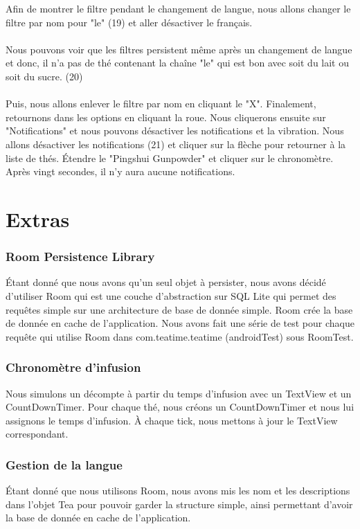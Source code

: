 \documentclass[a4paper,12pt]{article}
\begin{document}
\begin{spacing}{1}
	Afin de montrer le filtre pendant le changement de langue, nous allons changer le filtre par nom pour "le" (19) et aller désactiver le français. \\\\
	Nous pouvons voir que les filtres persistent même après un changement de langue et donc, il n'a pas de thé contenant la chaîne "le" qui est bon avec soit du lait ou soit du sucre. (20)\\\\
	Puis, nous allons enlever le filtre par nom en cliquant le "X".
	Finalement, retournons dans les options en cliquant la roue. Nous cliquerons ensuite sur "Notifications" et nous pouvons désactiver les notifications et la vibration. Nous allons désactiver les notifications (21) et cliquer sur la flèche pour retourner à la liste de thés.
	Étendre le "Pingshui Gunpowder" et cliquer sur le chronomètre. Après vingt secondes, il n'y aura aucune notifications.
	\newpage
	\section*{Extras}
	\subsubsection*{Room Persistence Library}
	Étant donné que nous avons qu'un seul objet à persister, nous avons décidé d'utiliser Room qui est une couche d'abstraction sur SQL Lite qui permet des requêtes simple sur une architecture de base de donnée simple. Room crée la base de donnée en cache de l'application. Nous avons fait une série de test pour chaque requête qui utilise Room dans com.teatime.teatime (androidTest) sous RoomTest.
	\subsubsection*{Chronomètre d'infusion}
	Nous simulons un décompte à partir du temps d'infusion avec un TextView et un CountDownTimer. Pour chaque thé, nous créons un CountDownTimer et nous lui assignons le temps d'infusion. À chaque tick, nous mettons à jour le TextView correspondant.
	\subsubsection*{Gestion de la langue}
	Étant donné que nous utilisons Room, nous avons mis les nom et les descriptions dans l'objet Tea pour pouvoir garder la structure simple, ainsi permettant d'avoir la base de donnée en cache de l'application.

\end{spacing}
\end{document}
